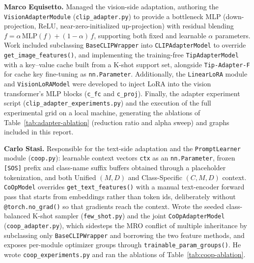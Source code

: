 \documentclass[10pt,twocolumn,letterpaper]{article}
\begin{document}
\noindent\textbf{Marco Equisetto.} Managed the vision-side adaptation, authoring the \texttt{VisionAdapterModule} (\texttt{clip\_adapter.py}) to provide a bottleneck MLP (down-projection, ReLU, near-zero-initialized up-projection) with residual blending \(f = \alpha\,\text{MLP}(f) + (1{-}\alpha)\,f\), supporting both fixed and learnable \(\alpha\) parameters. Work included subclassing \texttt{BaseCLIPWrapper} into \texttt{CLIPAdapterModel} to override \texttt{get\_image\_features()}, and implementing the training-free \texttt{TipAdapterModel} with a key--value cache built from a K-shot support set, alongside \texttt{Tip-Adapter-F} for cache key fine-tuning as \texttt{nn.Parameter}. Additionally, the \texttt{LinearLoRA} module and \texttt{VisionLoRAModel} were developed to inject LoRA into the vision transformer's MLP blocks (\texttt{c\_fc} and \texttt{c\_proj}). Finally, the adapter experiment script (\texttt{clip\_adapter\_experiments.py}) and the execution of the full experimental grid on a local machine, generating the ablations of Table~\ref{tab:adapter-ablation} (reduction ratio and alpha sweep) and graphs included in this report.
\medskip

\noindent\textbf{Carlo Stasi.} Responsible for the text-side adaptation and the \texttt{PromptLearner} module (\texttt{coop.py}): learnable
context vectors \texttt{ctx} as an \texttt{nn.Parameter}, frozen
\texttt{[SOS]} prefix and class-name suffix buffers obtained through a
placeholder tokenization, and both Unified $(M, D)$ and Class-Specific
$(C, M, D)$ context. \texttt{CoOpModel} overrides
\texttt{get\_text\_features()} with a manual text-encoder forward pass that
starts from embeddings rather than token ids, deliberately without
\texttt{@torch.no\_grad()} so that gradients reach the context. Wrote the
seeded class-balanced K-shot sampler (\texttt{few\_shot.py}) and the joint
\texttt{CoOpAdapterModel} (\texttt{coop\_adapter.py}), which sidesteps the
MRO conflict of multiple inheritance by subclassing only
\texttt{BaseCLIPWrapper} and borrowing the two feature methods, and exposes
per-module optimizer groups through \texttt{trainable\_param\_groups()}.
He wrote \texttt{coop\_experiments.py} and ran the ablations of
Table~\ref{tab:coop-ablation}.
\end{document}
